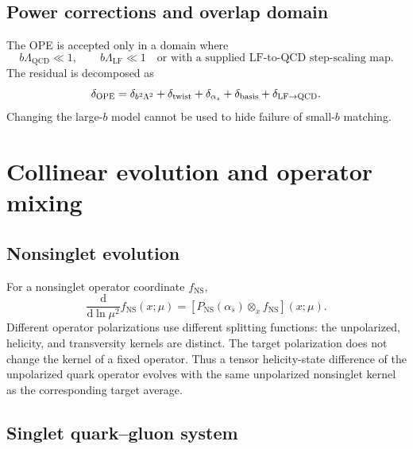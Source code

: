 \documentclass[11pt]{article}
\newcommand{\dd}{\mathrm{d}}
\newcommand{\LF}{\mathrm{LF}}
\newcommand{\QCD}{\mathrm{QCD}}
\newcommand{\otimesx}{\mathop{\otimes}_{x}}
\newcommand{\NS}{\mathrm{NS}}
\begin{document}
\subsection{Power corrections and overlap domain}

The OPE is accepted only in a domain where
\begin{equation}
 b\Lambda_{\QCD}\ll1,
 \qquad
 b\Lambda_{\LF}\ll1
 \quad\text{or with a supplied LF-to-QCD step-scaling map}.
 \label{eq:ope-domain}
\end{equation}
The residual is decomposed as
\begin{equation}
 \delta_{\rm OPE}
 =\delta_{b^2\Lambda^2}
 +\delta_{\rm twist}
 +\delta_{\alpha_s}
 +\delta_{\rm basis}
 +\delta_{\rm LF\to QCD}.
 \label{eq:ope-error-budget}
\end{equation}
Changing the large-\(b\) model cannot be used to hide failure of small-\(b\)
matching.


\section{Collinear evolution and operator mixing}
\label{sec:collinear-evolution}

\subsection{Nonsinglet evolution}

For a nonsinglet operator coordinate \(f_{\NS}\),
\begin{equation}
 \frac{\dd}{\dd\ln\mu^2}f_{\NS}(x;\mu)
 =
 \left[P_{\NS}(\alpha_s)\otimesx f_{\NS}\right](x;\mu).
 \label{eq:nonsinglet-dglap}
\end{equation}
Different operator polarizations use different splitting functions: the
unpolarized, helicity, and transversity kernels are distinct.  The target
polarization does not change the kernel of a fixed operator.  Thus a tensor
helicity-state difference of the unpolarized quark operator evolves with the
same unpolarized nonsinglet kernel as the corresponding target average.

\subsection{Singlet quark--gluon system}
\end{document}
